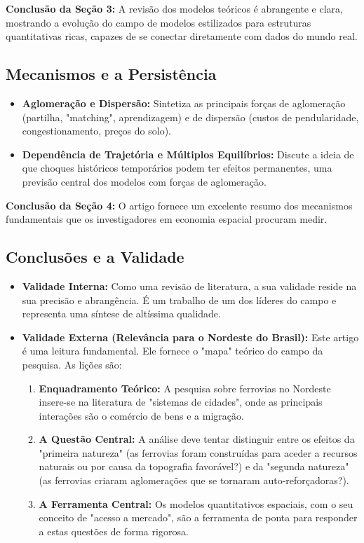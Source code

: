 \documentclass[12pt, a4paper]{article}
\begin{document}
\noindent\textbf{Conclusão da Seção 3:} A revisão dos modelos teóricos é abrangente e clara, mostrando a evolução do campo de modelos estilizados para estruturas quantitativas ricas, capazes de se conectar diretamente com dados do mundo real.

\subsection{Mecanismos e a Persistência}

\begin{itemize}
    \item \textbf{Aglomeração e Dispersão:} Sintetiza as principais forças de aglomeração (partilha, "matching", aprendizagem) e de dispersão (custos de pendularidade, congestionamento, preços do solo).
    \item \textbf{Dependência de Trajetória e Múltiplos Equilíbrios:} Discute a ideia de que choques históricos temporários podem ter efeitos permanentes, uma previsão central dos modelos com forças de aglomeração.
\end{itemize}

\noindent\textbf{Conclusão da Seção 4:} O artigo fornece um excelente resumo dos mecanismos fundamentais que os investigadores em economia espacial procuram medir.

\subsection{Conclusões e a Validade}
\begin{itemize}
    \item \textbf{Validade Interna:} Como uma revisão de literatura, a sua validade reside na sua precisão e abrangência. É um trabalho de um dos líderes do campo e representa uma síntese de altíssima qualidade.
    \item \textbf{Validade Externa (Relevância para o Nordeste do Brasil):} Este artigo é uma leitura fundamental. Ele fornece o "mapa" teórico do campo da pesquisa. As lições são:
        \begin{enumerate}
            \item \textbf{Enquadramento Teórico:} A pesquisa sobre ferrovias no Nordeste insere-se na literatura de "sistemas de cidades", onde as principais interações são o comércio de bens e a migração.
            \item \textbf{A Questão Central:} A análise deve tentar distinguir entre os efeitos da "primeira natureza" (as ferrovias foram construídas para aceder a recursos naturais ou por causa da topografia favorável?) e da "segunda natureza" (as ferrovias criaram aglomerações que se tornaram auto-reforçadoras?).
            \item \textbf{A Ferramenta Central:} Os modelos quantitativos espaciais, com o seu conceito de "acesso a mercado", são a ferramenta de ponta para responder a estas questões de forma rigorosa.
        \end{enumerate}
\end{itemize}
\end{document}
